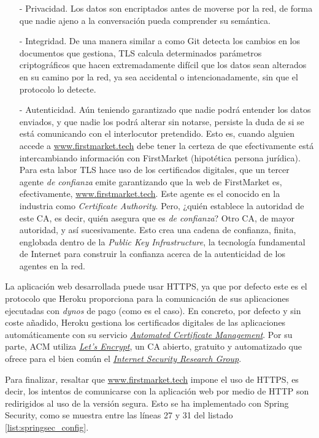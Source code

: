 \documentclass[a4paper,12pt,twoside,openright]{report}
\begin{document}
		\begin{itemize}
			\item[-] Privacidad. Los datos son encriptados antes de moverse por la red, de forma que nadie ajeno a la conversación pueda comprender su semántica.
			\item[-] Integridad. De una manera similar a como Git detecta los cambios en los documentos que gestiona, TLS calcula determinados parámetros criptográficos que hacen extremadamente difícil que los datos sean alterados en su camino por la red, ya sea accidental o intencionadamente, sin que el protocolo lo detecte.
			\item[-] Autenticidad. Aún teniendo garantizado que nadie podrá entender los datos enviados, y que nadie los podrá alterar sin notarse, persiste la duda de si se está comunicando con el interlocutor pretendido. Esto es, cuando alguien accede a \href{https://firstmarket.tech}{www.firstmarket.tech} debe tener la certeza de que efectivamente está intercambiando información con FirstMarket (hipotética persona jurídica). Para esta labor TLS hace uso de los certificados digitales, que un tercer agente \emph{de confianza} emite garantizando que la web de FirstMarket es, efectivamente, \href{https://firstmarket.tech}{www.firstmarket.tech}. Este agente es el conocido en la industria como \emph{Certificate Authority}. Pero, ¿quién establece la autoridad de este CA, es decir, quién asegura que es \emph{de confianza}? Otro CA, de mayor autoridad, y así sucesivamente. Esto crea una cadena de confianza, finita, englobada dentro de la \emph{Public Key Infrastructure}, la tecnología fundamental de Internet para construir la confianza acerca de la autenticidad de los agentes en la red.
		\end{itemize}
	
	La aplicación web desarrollada puede usar HTTPS, ya que por defecto este es el protocolo que Heroku proporciona para la comunicación de sus aplicaciones ejecutadas con \emph{dynos} de pago (como es el caso). En concreto, por defecto y sin coste añadido, Heroku gestiona los certificados digitales de las aplicaciones automáticamente con su servicio \href{https://devcenter.heroku.com/articles/automated-certificate-management}{\emph{Automated Certificate Management}}. Por su parte, ACM utiliza \href{https://letsencrypt.org/}{\emph{Let’s Encrypt}}, un CA abierto, gratuito y automatizado que ofrece para el bien común el \href{https://www.abetterinternet.org/}{\emph{Internet Security Research Group}}.
	
	Para finalizar, resaltar que \href{https://firstmarket.tech}{www.firstmarket.tech} impone el uso de HTTPS, es decir, los intentos de comunicarse con la aplicación web por medio de HTTP son redirigidos al uso de la versión segura. Esto se ha implementado con Spring Security, como se muestra entre las líneas 27 y 31 del listado \ref{list:springsec_config}.
	
\end{document}
